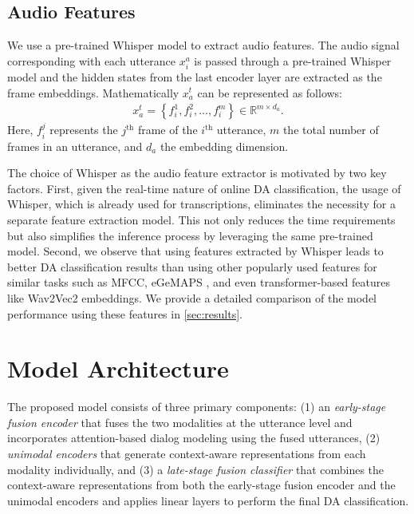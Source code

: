\subsection*{Audio Features} We use a pre-trained Whisper model to extract audio features.
The audio signal corresponding with each utterance $x_{i}^a$ is passed through a pre-trained Whisper model and the hidden states from the last encoder layer are extracted as the frame embeddings. Mathematically $x_{a}^t$ can be represented as follows:
%
\begin{align}
x_{a}^t = \left\{f_{i}^1, f_{i}^2, ..., f_{i}^m\right\} \in \mathbb{R}^{m \times d_{a}}.
\end{align}
%
Here, $f_{i}^j$ represents the $j^\text{th}$ frame of the $i^\text{th}$ utterance,
$m$ the total number of frames in an utterance, and $d_{a}$ the embedding dimension.

The choice of Whisper as the audio feature extractor is motivated by two key factors.
First, given the real-time nature of online DA classification, the usage of Whisper, which is already used for transcriptions, eliminates the necessity for a separate feature extraction model.
This not only reduces the time requirements but also simplifies the inference process by leveraging the same pre-trained model.
Second, we observe that using features extracted by Whisper leads to better DA classification results than using other popularly used features for similar tasks such as MFCC, eGeMAPS \cite{7160715}, and even transformer-based features like Wav2Vec2 \cite{baevski2020wav2vec} embeddings.
We provide a detailed comparison of the model performance using these features in \autoref{sec:results}.



\section{Model Architecture}

The proposed model consists of three primary components:
(1) an \textit{early-stage fusion encoder} that fuses the two modalities at the utterance level and incorporates attention-based dialog modeling using the fused utterances, 
(2) \textit{unimodal encoders} that generate context-aware representations from each modality individually, and 
(3) a \textit{late-stage fusion classifier} that combines the context-aware representations from both the early-stage fusion encoder and the unimodal encoders and applies linear layers to perform the final DA classification.



